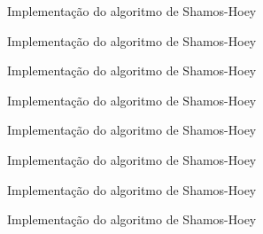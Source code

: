 

\begin{frame}[fragile]{Implementação do algoritmo de Shamos-Hoey}
\end{frame}

\begin{frame}[fragile]{Implementação do algoritmo de Shamos-Hoey}
\end{frame}

\begin{frame}[fragile]{Implementação do algoritmo de Shamos-Hoey}
\end{frame}

\begin{frame}[fragile]{Implementação do algoritmo de Shamos-Hoey}
\end{frame}

\begin{frame}[fragile]{Implementação do algoritmo de Shamos-Hoey}
\end{frame}

\begin{frame}[fragile]{Implementação do algoritmo de Shamos-Hoey}
\end{frame}

\begin{frame}[fragile]{Implementação do algoritmo de Shamos-Hoey}
\end{frame}

\begin{frame}[fragile]{Implementação do algoritmo de Shamos-Hoey}
\end{frame}

